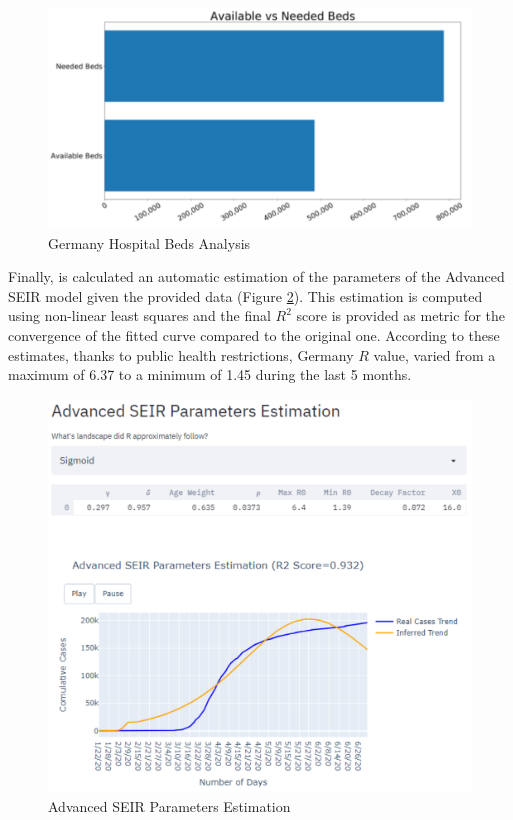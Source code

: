 \vspace{-0.3cm}
\begin{figure}[ht!]%
    \centering
    \includegraphics[width=0.65\linewidth]{latex/images/cov_g3.pdf}
    \vspace{-0.3cm}
    \caption{Germany Hospital Beds Analysis}
    \label{germ_bed}
    \vspace{-0.3cm}
\end{figure}

\vspace{-0.3cm}
Finally, is calculated an automatic estimation of the parameters of the Advanced SEIR model given the provided data (Figure \ref{par_est}). This estimation is computed using non-linear least squares and the final $R^{2}$ score is provided as metric for the convergence of the fitted curve compared to the original one. According to these estimates, thanks to public health restrictions, Germany $R$ value, varied from a maximum of 6.37 to a minimum of 1.45 during the last 5 months.

\begin{figure}[ht!]%
    \centering
    \includegraphics[width=0.75\linewidth]{latex/images/germ_params.pdf}
    \caption{Advanced SEIR Parameters Estimation}
    \label{par_est}
\end{figure}

